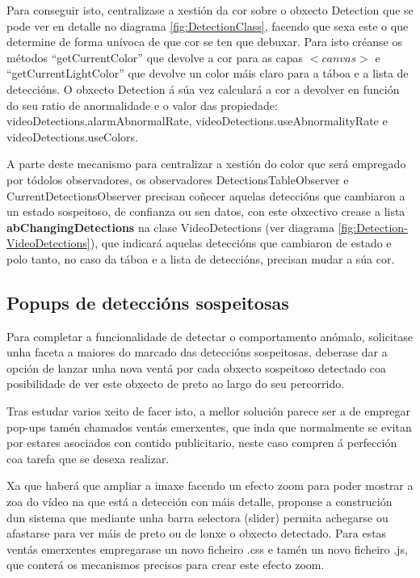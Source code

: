     Para conseguir isto, centralizase a xestión da cor sobre o obxecto Detection que se pode ver en
    detalle no diagrama \ref{fig:DetectionClass}, facendo que sexa 
    este o que determine de forma unívoca de que cor se ten que debuxar. Para isto créanse os 
    métodos ``getCurrentColor'' que devolve a cor para as capas $<canvas>$ e 
    ``getCurrentLightColor'' que devolve un color máis claro para a táboa e a lista de deteccións.
    O obxecto Detection á súa vez calculará a cor a devolver en función do seu ratio de anormalidade
    e o valor das propiedade: videoDetections.alarmAbnormalRate, videoDetections.useAbnormalityRate
    e videoDetections.useColors.
    
    A parte deste mecanismo para centralizar a xestión do color que será empregado por tódolos 
    observadores, os observadores DetectionsTableObserver e CurrentDetectionsObserver precisan 
    coñecer aquelas deteccións que cambiaron a un estado sospeitoso, de confianza ou sen datos,
    con este obxectivo crease a lista \textbf{abChangingDetections} na clase VideoDetections
    (ver diagrama \ref{fig:Detection-VideoDetections}), que indicará aquelas
    deteccións que cambiaron de estado e polo tanto, no caso da táboa e a lista de deteccións, 
    precisan mudar a súa cor.
    
    \subsection{Popups de deteccións sospeitosas}

        Para completar a funcionalidade de detectar o comportamento anómalo, solicitase unha faceta a 
        maiores do marcado das deteccións sospeitosas, deberase dar a opción de lanzar unha nova ventá
        por cada obxecto sospeitoso detectado coa posibilidade de ver este obxecto de preto ao largo do
        seu percorrido.
        
        Tras estudar varios xeito de facer isto, a mellor solución parece ser a de empregar pop-ups 
        tamén chamados ventás emerxentes, que inda que normalmente se evitan por estares asociados 
        con contido publicitario, neste caso compren á perfección coa tarefa que se desexa realizar.
        
        Xa que haberá que ampliar a imaxe facendo un efecto zoom para poder mostrar a zoa do vídeo na
        que está a detección con máis detalle, proponse a construción dun sistema que mediante unha
        barra selectora (slider) permita achegarse ou afastarse para ver máis de preto ou de lonxe o 
        obxecto detectado. Para estas ventás emerxentes empregarase un novo ficheiro .css e tamén un 
        novo ficheiro .js, que conterá os mecanismos precisos para crear este efecto zoom.
        
